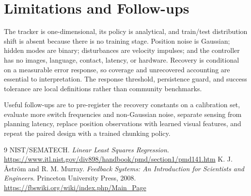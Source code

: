 \documentclass[11pt]{article}
\begin{document}
\clearpage
\section{Limitations and Follow-ups}

The tracker is one-dimensional, its policy is analytical, and train/test distribution shift is absent because there is no training stage. Position noise is Gaussian; hidden modes are binary; disturbances are velocity impulses; and the controller has no images, language, contact, latency, or hardware. Recovery is conditional on a measurable error response, so coverage and unrecovered accounting are essential to interpretation. The response threshold, persistence guard, and success tolerance are local definitions rather than community benchmarks.

Useful follow-ups are to pre-register the recovery constants on a calibration set, evaluate more switch frequencies and non-Gaussian noise, separate sensing from planning latency, replace position observations with learned visual features, and repeat the paired design with a trained chunking policy.

\begin{thebibliography}{9}
 NIST/SEMATECH. \emph{Linear Least Squares Regression}. \url{https://www.itl.nist.gov/div898/handbook/pmd/section1/pmd141.htm}
 K. J. \AA str\"om and R. M. Murray. \emph{Feedback Systems: An Introduction for Scientists and Engineers}. Princeton University Press, 2008. \url{https://fbswiki.org/wiki/index.php/Main_Page}
\end{thebibliography}
\end{document}
